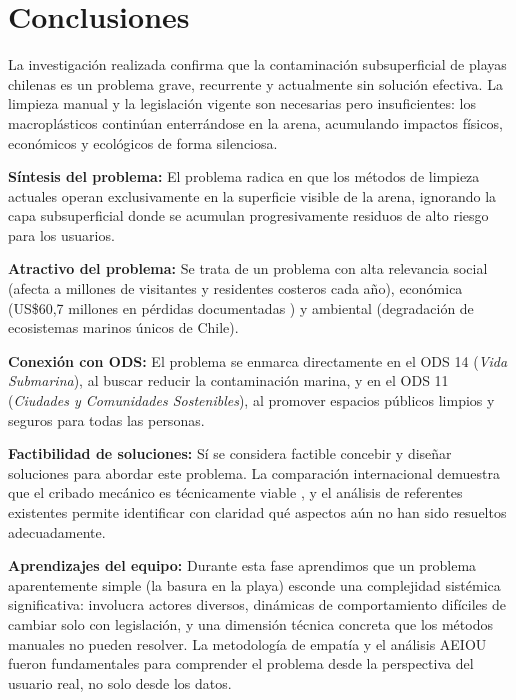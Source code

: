 \documentclass[12pt, letterpaper]{article}
\begin{document}
\newpage
\section{Conclusiones}

La investigación realizada confirma que la contaminación subsuperficial de playas chilenas
es un problema grave, recurrente y actualmente sin solución efectiva. La limpieza manual
y la legislación vigente son necesarias pero insuficientes: los macroplásticos continúan
enterrándose en la arena, acumulando impactos físicos, económicos y ecológicos de
forma silenciosa.

\textbf{Síntesis del problema:} El problema radica en que los métodos de limpieza
actuales operan exclusivamente en la superficie visible de la arena, ignorando la capa
subsuperficial donde se acumulan progresivamente residuos de alto riesgo para los usuarios.

\textbf{Atractivo del problema:} Se trata de un problema con alta relevancia social
(afecta a millones de visitantes y residentes costeros cada año), económica
(US\$60,7 millones en pérdidas documentadas \parencite{oceana_2026}) y ambiental
(degradación de ecosistemas marinos únicos de Chile).

\textbf{Conexión con ODS:} El problema se enmarca directamente en el ODS 14
(\textit{Vida Submarina}), al buscar reducir la contaminación marina, y en el ODS 11
(\textit{Ciudades y Comunidades Sostenibles}), al promover espacios públicos limpios
y seguros para todas las personas.

\textbf{Factibilidad de soluciones:} Sí se considera factible concebir y diseñar
soluciones para abordar este problema. La comparación internacional demuestra que
el cribado mecánico es técnicamente viable \parencite{canon_2021}, y el análisis de
referentes existentes \parencite{garcia_dominguez_2021} permite identificar con
claridad qué aspectos aún no han sido resueltos adecuadamente.

\textbf{Aprendizajes del equipo:} Durante esta fase aprendimos que un problema
aparentemente simple (la basura en la playa) esconde una complejidad sistémica
significativa: involucra actores diversos, dinámicas de comportamiento difíciles de
cambiar solo con legislación, y una dimensión técnica concreta que los métodos
manuales no pueden resolver. La metodología de empatía y el análisis AEIOU fueron
fundamentales para comprender el problema desde la perspectiva del usuario real,
no solo desde los datos.
\end{document}
